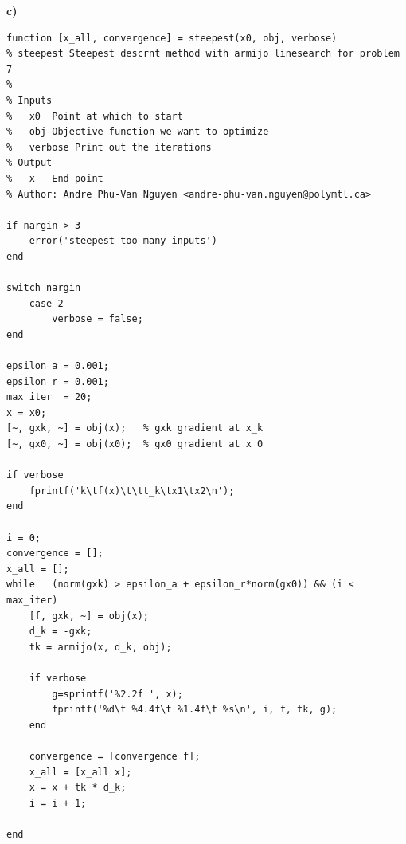 \textbf{c)}
\begin{lstlisting}[style=Matlab-editor]
function [x_all, convergence] = steepest(x0, obj, verbose)
% steepest Steepest descrnt method with armijo linesearch for problem 7
%   
% Inputs
%   x0  Point at which to start
%   obj Objective function we want to optimize
%   verbose Print out the iterations
% Output 
%   x   End point
% Author: Andre Phu-Van Nguyen <andre-phu-van.nguyen@polymtl.ca>

if nargin > 3
    error('steepest too many inputs')
end

switch nargin
    case 2
        verbose = false;
end

epsilon_a = 0.001;
epsilon_r = 0.001;
max_iter  = 20;
x = x0;
[~, gxk, ~] = obj(x);   % gxk gradient at x_k
[~, gx0, ~] = obj(x0);  % gx0 gradient at x_0

if verbose
    fprintf('k\tf(x)\t\tt_k\tx1\tx2\n');
end

i = 0;
convergence = [];
x_all = [];
while   (norm(gxk) > epsilon_a + epsilon_r*norm(gx0)) && (i < max_iter)
    [f, gxk, ~] = obj(x);
    d_k = -gxk;
    tk = armijo(x, d_k, obj);
    
    if verbose
        g=sprintf('%2.2f ', x);
        fprintf('%d\t %4.4f\t %1.4f\t %s\n', i, f, tk, g);
    end
    
    convergence = [convergence f];
    x_all = [x_all x];
    x = x + tk * d_k;
    i = i + 1;
    
end
\end{lstlisting}

